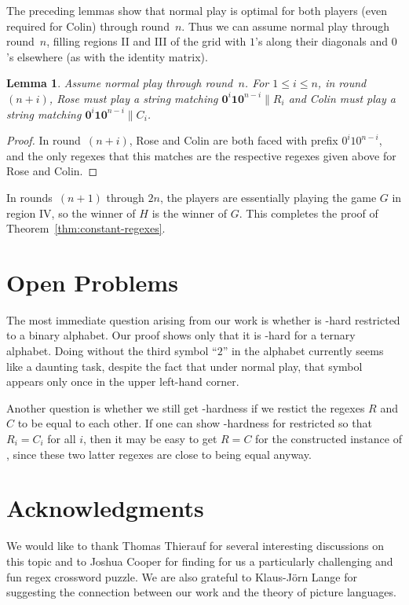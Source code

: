 \documentclass{article}
\newcommand{\0}{\mathbf{0}}
\newcommand{\1}{\mathbf{1}}
\newcommand{\2}{\mathbf{2}}
\theoremstyle{plain}
\newtheorem{lemma}[theorem]{Lemma}
\theoremstyle{definition}
\begin{document}
The preceding lemmas show that normal play is optimal for both players (even required for Colin) through round~$n$.  Thus we can assume normal play through round~$n$, filling regions II and III of the grid with $1$'s along their diagonals and $0$'s elsewhere (as with the identity matrix).

\begin{lemma}
  Assume normal play through round~$n$.  For $1\le i\le n$, in round~$(n+i)$, Rose must play a string matching $\0^i\1\0^{n-i}\|R_i$ and Colin must play a string matching $\0^i\1\0^{n-i}\|C_i$.
\end{lemma}
\begin{proof}
  In round~$(n+i)$, Rose and Colin are both faced with prefix $0^i10^{n-i}$, and the only regexes that this matches are the respective regexes given above for Rose and Colin.
\end{proof}

In rounds~$(n+1)$ through $2n$, the players are essentially playing the game $G$ in region IV, so the winner of $H$ is the winner of $G$. This completes the proof of Theorem~\ref{thm:constant-regexes}.

\section{Open Problems}\label{sec:open}

The most immediate question arising from our work is whether  is -hard restricted to a binary alphabet.  Our proof shows only that it is -hard for a ternary alphabet. Doing without the third symbol ``$2$'' in the alphabet currently seems like a daunting task, despite the fact that under normal play, that symbol appears only once in the upper left-hand corner.

Another question is whether we still get -hardness if we restict the regexes $R$ and $C$ to be equal to each other.  If one can show -hardness for  restricted so that $R_i = C_i$ for all $i$, then it may be easy to get $R=C$ for the constructed instance of , since these two latter regexes are close to being equal anyway.

\section*{Acknowledgments}

We would like to thank Thomas Thierauf for several interesting discussions on this topic and to Joshua Cooper for finding for us a particularly challenging and fun regex crossword puzzle.  We are also grateful to Klaus-J\"orn Lange for suggesting the connection between our work and the theory of picture languages.

\nocite{*}


\end{document}
